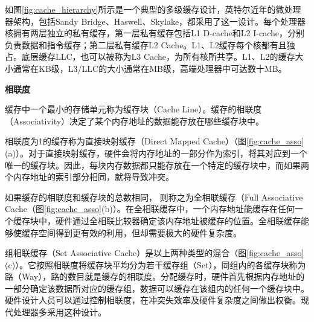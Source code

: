 如图\ref{fig:cache_hierarchy}所示是一个典型的多级缓存设计，英特尔近年的微处理器架构，包括Sandy Bridge、Haswell、Skylake，都采用了这一设计。每个处理器核拥有两层独立的私有缓存，第一层私有缓存包括L1 D-cache和L2 I-cache，分别负责数据和指令缓存；第二层私有缓存L2 Cache。L1、L2缓存每个核都有且独占。底层缓存LLC，也可以被称为L3 Cache，为所有核所共享。L1、L2的缓存大小通常在KB级，L3/LLC的大小通常在MB级，高端处理器中可达数十MB。


\textbf{相联度}

缓存中一个最小的存储单元称为缓存块（Cache Line）。缓存的相联度（Associativity）决定了某个内存地址的数据能存放在哪些缓存块中。

相联度为1的缓存称为直接映射缓存（Direct Mapped Cache）（图\ref{fig:cache_asso}(a)）。对于直接映射缓存，硬件会将内存地址的一部分作为索引，将其对应到一个唯一的缓存块。因此，每块内存数据都只能存放在一个特定的缓存块中，而如果两个内存地址的索引部分相同，就将导致冲突。

如果缓存的相联度和缓存块的总数相同， 则称之为全相联缓存（Full Associative Cache（图\ref{fig:cache_asso}(b)）。在全相联缓存中，一个内存地址能缓存在任何一个缓存块中，硬件通过全相联比较器确定该内存地址被缓存的位置。全相联缓存能够使缓存空间得到更有效的利用，但却需要极大的硬件复杂度。

组相联缓存（Set Associative Cache）是以上两种类型的混合（图\ref{fig:cache_asso}(c)）。它按照相联度将缓存块平均分为若干缓存组（Set），同组内的各缓存块称为路（Way），路的数目就是缓存的相联度。分配缓存时，硬件首先根据内存地址的一部分确定该数据所对应的缓存组，数据可以缓存在该组内的任何一个缓存块中。硬件设计人员可以通过控制相联度，在冲突失效率及硬件复杂度之间做出权衡。现代处理器多采用这种设计。

